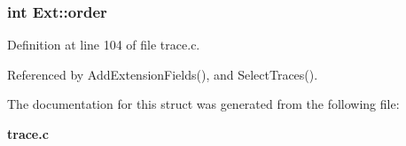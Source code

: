 \subsubsection{\setlength{\rightskip}{0pt plus 5cm}int \bf{Ext::order}}\label{structExt_bbbe4446428e2cb27dfbede10d3b2ed9}




Definition at line 104 of file trace.c.

Referenced by Add\-Extension\-Fields(), and Select\-Traces().

The documentation for this struct was generated from the following file:\begin{CompactItemize}
\item 
\bf{trace.c}\end{CompactItemize}
